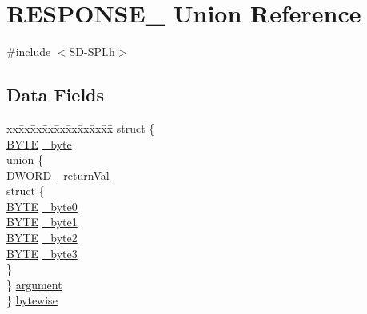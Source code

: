 \hypertarget{union_r_e_s_p_o_n_s_e__7}{}\section{R\+E\+S\+P\+O\+N\+S\+E\+\_ Union Reference}
\label{union_r_e_s_p_o_n_s_e__7}


{\ttfamily \#include $<$S\+D-\/\+S\+P\+I.\+h$>$}

\subsection*{Data Fields}
\begin{DoxyCompactItemize}
\item 
\begin{tabbing}
xx\=xx\=xx\=xx\=xx\=xx\=xx\=xx\=xx\=\kill
struct \{\\
\>\hyperlink{_generic_type_defs_8h_a4ae1dab0fb4b072a66584546209e7d58}{BYTE} \hyperlink{union_r_e_s_p_o_n_s_e__7_aad6b25752650539bbd15773c4b71b4d4}{\_byte}\\
\>union \{\\
\>\>\hyperlink{_generic_type_defs_8h_ad342ac907eb044443153a22f964bf0af}{DWORD} \hyperlink{union_r_e_s_p_o_n_s_e__7_aa96c16eea9a595aa40e24d2b22f5b725}{\_returnVal}\\
\>\>struct \{\\
\>\>\>\hyperlink{_generic_type_defs_8h_a4ae1dab0fb4b072a66584546209e7d58}{BYTE} \hyperlink{union_r_e_s_p_o_n_s_e__7_a93716eb22819e26ee62f5d28d97adb9f}{\_byte0}\\
\>\>\>\hyperlink{_generic_type_defs_8h_a4ae1dab0fb4b072a66584546209e7d58}{BYTE} \hyperlink{union_r_e_s_p_o_n_s_e__7_a7d5f3b40b15af6ed45be5faa5100147c}{\_byte1}\\
\>\>\>\hyperlink{_generic_type_defs_8h_a4ae1dab0fb4b072a66584546209e7d58}{BYTE} \hyperlink{union_r_e_s_p_o_n_s_e__7_a32a342025f3d1eed4ac129d9253460e3}{\_byte2}\\
\>\>\>\hyperlink{_generic_type_defs_8h_a4ae1dab0fb4b072a66584546209e7d58}{BYTE} \hyperlink{union_r_e_s_p_o_n_s_e__7_ad55acc2163a3be8554a1f2229882af18}{\_byte3}\\
\>\>\} \\
\>\} \hyperlink{union_r_e_s_p_o_n_s_e__7_a885546481f63d2a57b7172680f03ddf8}{argument}\\
\} \hyperlink{union_r_e_s_p_o_n_s_e__7_a3b5a8ababdc908ffe3142ef79aa8112f}{bytewise}\\


\end{tabbing}
\end{DoxyCompactItemize}
